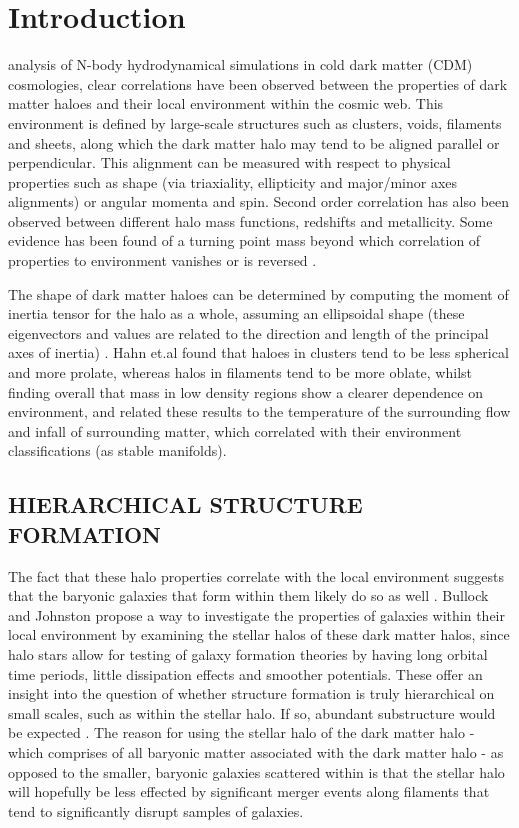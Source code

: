 \documentclass[journal]{IEEEtran}
\begin{document}
\IEEEpeerreviewmaketitle

\section{Introduction}
 analysis of N-body hydrodynamical simulations in cold dark matter (CDM) cosmologies, clear correlations have been observed between the properties of dark matter haloes and their local environment within the cosmic web. This environment is defined by large-scale structures such as clusters, voids, filaments and sheets, along which the dark matter halo may tend to be aligned parallel or perpendicular. This alignment can be measured with respect to physical properties such as shape (via triaxiality, ellipticity and major/minor axes alignments) or angular momenta and spin. Second order correlation has also been observed between different halo mass functions, redshifts and metallicity. Some evidence has been found of a turning point mass beyond which correlation of properties to environment vanishes or is reversed \cite{hahn07b} \cite{dubois14}. 

The shape of dark matter haloes can be determined by computing the moment of inertia tensor for the halo as a whole, assuming an ellipsoidal shape (these eigenvectors and values are related to the direction and length of the principal axes of inertia) \cite{hahn07a}. Hahn et.al \cite{hahn07a} found that haloes in clusters tend to be less spherical and more prolate, whereas halos in filaments tend to be more oblate, whilst finding overall that mass in low density regions show a clearer dependence on environment, and related these results to the temperature of the surrounding flow and infall of surrounding matter, which correlated with their environment classifications (as stable manifolds). 

\subsection*{HIERARCHICAL STRUCTURE FORMATION}

The fact that these halo properties correlate with the local environment suggests that the baryonic galaxies that form within them likely do so as well \cite{hahn07b}.  Bullock and Johnston \cite{bullock05} propose a way to investigate the properties of galaxies within their local environment by examining the stellar halos of these dark matter halos, since halo stars allow for testing of galaxy formation theories by having long orbital time periods, little dissipation effects and smoother potentials. These offer an insight into the question of whether structure formation is truly hierarchical on small scales, such as within the stellar halo. If so, abundant substructure would be expected \cite{bullock05}. The reason for using the stellar halo of the dark matter halo - which comprises of all baryonic matter associated with the dark matter halo - as opposed to the smaller, baryonic galaxies scattered within is that the stellar halo will hopefully be less effected by significant merger events along filaments that tend to significantly disrupt samples of galaxies.
\end{document}
